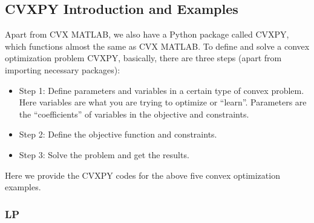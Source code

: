 \documentclass[
]{book}
\theoremstyle{definition}
\theoremstyle{definition}
\theoremstyle{definition}
\theoremstyle{definition}
\theoremstyle{remark}
\begin{document}
\hypertarget{cvxpy-introduction-and-examples}{%
\subsection{CVXPY Introduction and Examples}\label{cvxpy-introduction-and-examples}}

Apart from CVX MATLAB, we also have a Python package called CVXPY, which functions almost the same as CVX MATLAB. To define and solve a convex optimization problem CVXPY, basically, there are three steps (apart from importing necessary packages):

\begin{itemize}
\item
  Step 1: Define parameters and variables in a certain type of convex problem. Here variables are what you are trying to optimize or ``learn''. Parameters are the ``coefficients'' of variables in the objective and constraints.
\item
  Step 2: Define the objective function and constraints.
\item
  Step 3: Solve the problem and get the results.
\end{itemize}

Here we provide the CVXPY codes for the above five convex optimization examples.

\hypertarget{lp}{%
\subsubsection{LP}\label{lp}}
\end{document}
